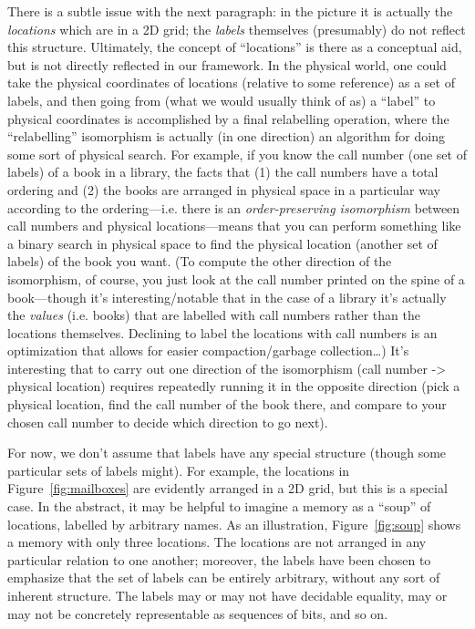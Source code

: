 \documentclass{jfp1}
\begin{document}
\begin{commentary}
  There is a subtle issue with the next paragraph: in the picture it
  is actually the \emph{locations} which are in a 2D grid; the
  \emph{labels} themselves (presumably) do not reflect this structure.
  Ultimately, the concept of ``locations'' is there as a conceptual
  aid, but is not directly reflected in our framework.  In the
  physical world, one could take the physical coordinates of locations
  (relative to some reference) as a set of labels, and then going from
  (what we would usually think of as) a ``label'' to physical
  coordinates is accomplished by a final relabelling operation, where
  the ``relabelling'' isomorphism is actually (in one direction) an
  algorithm for doing some sort of physical search.  For example, if
  you know the call number (one set of labels) of a book in a library,
  the facts that (1) the call numbers have a total ordering and (2)
  the books are arranged in physical space in a particular way
  according to the ordering---i.e. there is an \emph{order-preserving
    isomorphism} between call numbers and physical locations---means
  that you can perform something like a binary search in physical
  space to find the physical location (another set of labels) of the
  book you want.  (To compute the other direction of the isomorphism,
  of course, you just look at the call number printed on the spine of
  a book---though it's interesting/notable that in the case of a
  library it's actually the \emph{values} (i.e. books) that are
  labelled with call numbers rather than the locations themselves.
  Declining to label the locations with call numbers is an
  optimization that allows for easier compaction/garbage
  collection\dots) It's interesting that to carry out one direction of
  the isomorphism (call number -> physical location) requires
  repeatedly running it in the opposite direction (pick a physical
  location, find the call number of the book there, and compare to
  your chosen call number to decide which direction to go next).
\end{commentary}

For now, we don't assume that labels have any special structure
(though some particular sets of labels might).  For example, the
locations in Figure~\ref{fig:mailboxes} are evidently arranged in a 2D
grid, but this is a special case.  In the abstract, it may be
helpful to imagine a memory as a ``soup'' of locations, labelled by
arbitrary names.  As an illustration, Figure~\ref{fig:soup} shows a
memory with only three locations. The locations are not arranged in
any particular relation to one another; moreover, the labels have been
chosen to emphasize that the set of labels can be entirely arbitrary,
without any sort of inherent structure.  The labels may or may not
have decidable equality, may or may not be concretely representable as
sequences of bits, and so on.
\end{document}
